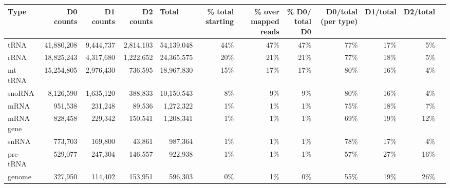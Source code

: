 \documentclass[12pt]{rockefeller}
\begin{document}
\begin{table}[h!]
  \begin{adjustbox}{max width = \textwidth}
  \def\arraystretch{1.5}
  \tabulinesep=1.2mm  

  \begin{tabular}{|l|r|r|r|r|r|r|r|r|r|r|r}
\hline
           Type &   D0 counts &   D1 counts &  D2 counts &        \multicolumn{1}{l|}{Total} & \multicolumn{1}{m{2.5cm}|}{\% total starting}  & \multicolumn{1}{m{2cm}|}{\% over mapped reads}  & \multicolumn{1}{m{2cm}|}{\% D0/ total D0} & \multicolumn{1}{m{2cm}|}{D0/total (per type)} & D1/total & D2/total \\
\hline
           tRNA &  41,880,208 &   9,444,737 &  2,814,103 &   54,139,048 &               44\% &                  47\% &            47\% &                 77\% &      17\% &       5\% \\
           rRNA &  18,825,243 &   4,317,680 &  1,222,652 &   24,365,575 &               20\% &                  21\% &            21\% &                 77\% &      18\% &       5\% \\
        mt tRNA &  15,254,805 &   2,976,430 &    736,595 &   18,967,830 &               15\% &                  17\% &            17\% &                 80\% &      16\% &       4\% \\
         snoRNA &   8,126,590 &   1,635,120 &    388,833 &   10,150,543 &                8\% &                   9\% &             9\% &                 80\% &      16\% &       4\% \\
           mRNA &     951,538 &     231,248 &     89,536 &    1,272,322 &                1\% &                   1\% &             1\% &                 75\% &      18\% &       7\% \\
      mRNA gene &     828,458 &     229,342 &    150,541 &    1,208,341 &                1\% &                   1\% &             1\% &                 69\% &      19\% &      12\% \\
          snRNA &     773,703 &     169,800 &     43,861 &      987,364 &                1\% &                   1\% &             1\% &                 78\% &      17\% &       4\% \\
      pre-tRNA &     529,077 &     247,304 &    146,557 &      922,938 &                1\% &                   1\% &             1\% &                 57\% &      27\% &      16\% \\
         genome &     327,950 &     114,402 &    153,951 &      596,303 &                0\% &                   1\% &             0\% &                 55\% &      19\% &      26\% \\

\end{tabular}
\end{adjustbox}
\end{table}
\end{document}

